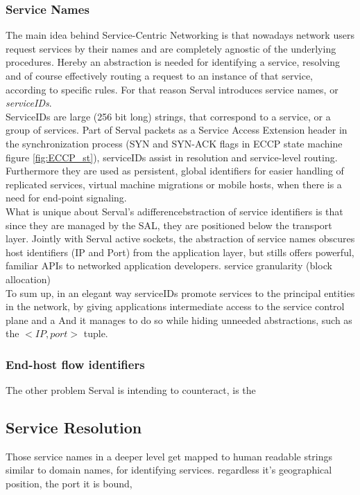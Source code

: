 \subsubsection{Service Names}
The main idea behind Service-Centric Networking is that nowadays network users request services by their names and are completely agnostic of the underlying procedures.
Hereby an abstraction is needed for identifying a service, resolving and of course effectively routing a request to an instance of that service, according to specific rules.
For that reason Serval introduces service names, or \emph{serviceIDs}.\\
\indent ServiceIDs are large (256 bit long) strings, that correspond to a service, or a group of services.
Part of Serval packets as a Service Access Extension header in the synchronization process (SYN and SYN-ACK flags in ECCP state machine figure \ref{fig:ECCP_st}), serviceIDs assist in resolution and service-level routing.
Furthermore they are used as persistent, global identifiers for easier handling of replicated services, virtual machine migrations or mobile hosts, when there is a need for end-point signaling.\\
\indent What is unique about Serval's adifferencebstraction of service identifiers is that since they are managed by the SAL, they are positioned below the transport layer.
Jointly with Serval active sockets, the abstraction of service names obscures host identifiers (IP and Port) from the application layer, but stills offers powerful, familiar APIs to networked application developers.
\indent service granularity (block allocation) \\
\indent To sum up, in an elegant way serviceIDs promote services to the principal entities in the network, by giving applications intermediate access to the service control plane and a
And it manages to do so while hiding unneeded abstractions, such as the $<IP, port>$ tuple.

\subsubsection{End-host flow identifiers}
The other problem Serval is intending to counteract, is the 

\subsection{Service Resolution}
Those service names in a deeper level get mapped to 
human readable strings similar to domain names, for identifying services.
regardless it's geographical position, the port it is bound, 


